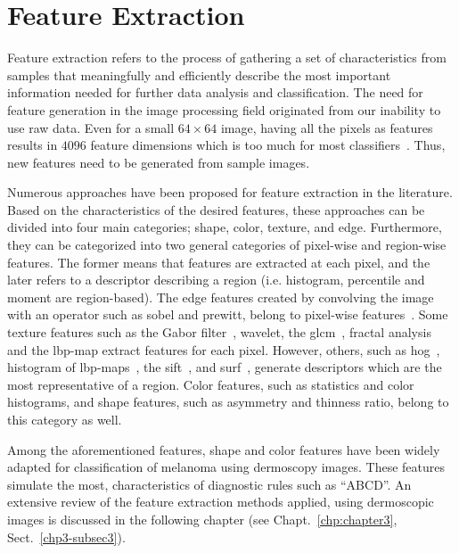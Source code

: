 \section{Feature Extraction} \label{sec:chp2-sec3}
Feature extraction refers to the process of gathering a set of characteristics from samples that meaningfully and efficiently describe the most important information needed for further data analysis and classification.
The need for feature generation in the image processing field originated from our inability to use raw data. 
Even for a small $64 \times 64$ image, having all the pixels as features results in $4096$ feature dimensions which is too much for most classifiers~\cite{Theodoridis2006327}.
Thus, new features need to be generated from sample images.

Numerous approaches have been proposed for feature extraction in the literature.  
Based on the characteristics of the desired features, these approaches can be divided into four main categories; shape, color, texture, and edge.
Furthermore, they can be categorized into two general categories of pixel-wise and region-wise features. 
The former means that features are extracted at each pixel, and the later refers to a descriptor describing a region (i.e. histogram, percentile and moment are region-based). 
The edge features created by convolving the image with an operator such as sobel and prewitt, belong to pixel-wise features~\cite{lemaitre2015computer}. 
Some texture features such as the Gabor filter~\cite{gabor1946theory,daugman1985uncertainty}, wavelet, the \acf{glcm}~\cite{haralick1973textural}, fractal analysis~\cite{benassi1998identifying} and the \ac{lbp}-map extract features for each pixel.
However, others, such as \acf{hog}~\cite{dalal2005histograms}, histogram of \acf{lbp}-maps~\cite{ojala1996comparative}, the \acf{sift}~\cite{lowe2004distinctive}, and \acf{surf}~\cite{bay2006surf}, generate descriptors which are the most representative of a region.
Color features, such as statistics and color histograms, and shape features, such as asymmetry and thinness ratio, belong to this category as well.  

Among the aforementioned features, shape and color features have been widely adapted for classification of melanoma using dermoscopy images. 
These features simulate the most, characteristics of diagnostic rules such as ``ABCD''.
An extensive review of the feature extraction methods applied, using dermoscopic images is discussed in the following chapter (see Chapt.~\ref{chp:chapter3}, Sect.~\ref{chp3-subsec3}).






